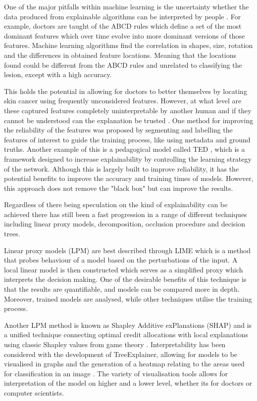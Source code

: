\documentclass[12pt]{report}
\begin{document}
One of the major pitfalls within machine learning is the uncertainty whether the data produced from explainable algorithms can be interpreted by people \cite{Nguyen2015}. For example, doctors are taught of the ABCD rules which define a set of the most dominant features which over time evolve into more dominant versions of those features. Machine learning algorithms find the correlation in shapes, size, rotation and the differences in obtained feature locations. Meaning that the locations found could be different from the ABCD rules and unrelated to classifying the lesion, except with a high accuracy.

This holds the potential in allowing for doctors to better themselves by locating skin cancer using frequently unconsidered features. However, at what level are these captured features completely uninterpretable by another human and if they cannot be understood can the explanation be trusted \cite{Gilpin2018}. One method for improving the reliability of the features was proposed by segmenting and labelling the features of interest to guide the training process, like using metadata and ground truths. Another example of this is a pedagogical model called TED \cite{Hind2019}, which is a framework designed to increase explainability by controlling the learning strategy of the network. Although this is largely built to improve reliability, it has the potential benefits to improve the accuracy and training times of models. However, this approach does not remove the "black box" but can improve the results.

Regardless of there being speculation on the kind of explainability can be achieved there has still been a fast progression in a range of different techniques including linear proxy models, decomposition, occlusion procedure and decision trees.

Linear proxy models (LPM) are best described through LIME \cite{Ribeiro2016} which is a method that probes behaviour of a model based on the perturbations of the input. A local linear model is then constructed which serves as a simplified proxy which interprets the decision making. One of the desirable benefits of this technique is that the results are quantifiable, and models can be compared more in depth. Moreover, trained models are analysed, while other techniques utilise the training process.

Another LPM method is known as Shapley Additive exPlanations (SHAP) and is a unified technique connecting optimal credit allocations with local explanations using classic Shapley values from game theory \cite{Lundberg2017}. Interpretability has been considered with the development of TreeExplainer, allowing for models to be visualised in graphs and the generation of a heatmap relating to the areas used for classification in an image \cite{Lundberg}. The variety of visualisation tools allows for interpretation of the model on higher and a lower level, whether its for doctors or computer scientists.
\end{document}
